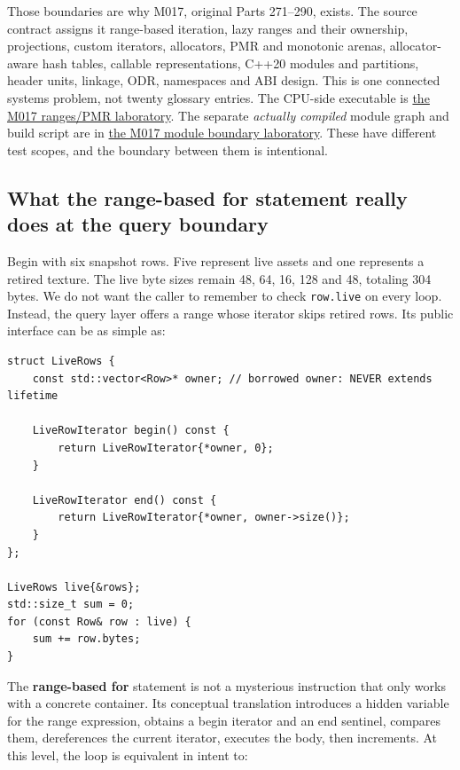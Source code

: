 Those boundaries are why M017, original Parts 271--290, exists. The source contract assigns it range-based iteration, lazy ranges and their ownership, projections, custom iterators, allocators, PMR and monotonic arenas, allocator-aware hash tables, callable representations, C++20 modules and partitions, header units, linkage, ODR, namespaces and ABI design. This is one connected systems problem, not twenty glossary entries. The CPU-side executable is \hyperref[source-file-a1c76c44bc377537c732f5c4]{the M017 ranges/PMR laboratory}. The separate \emph{actually compiled} module graph and build script are in \hyperref[source-file-e1b7c3e4f52da0e7c9c36a41]{the M017 module boundary laboratory}. These have different test scopes, and the boundary between them is intentional.

\subsection{What the range-based for statement really does at the query boundary}\label{01-foundations-i-ch006-what-the-range-based-for-statement-really-does-at-the-query-boundary}

Begin with six snapshot rows. Five represent live assets and one represents a retired texture. The live byte sizes remain 48, 64, 16, 128 and 48, totaling 304 bytes. We do not want the caller to remember to check \texttt{row.live} on every loop. Instead, the query layer offers a range whose iterator skips retired rows. Its public interface can be as simple as:

\begin{verbatim}
struct LiveRows {
    const std::vector<Row>* owner; // borrowed owner: NEVER extends lifetime

    LiveRowIterator begin() const {
        return LiveRowIterator{*owner, 0};
    }

    LiveRowIterator end() const {
        return LiveRowIterator{*owner, owner->size()};
    }
};

LiveRows live{&rows};
std::size_t sum = 0;
for (const Row& row : live) {
    sum += row.bytes;
}
\end{verbatim}

The \textbf{range-based for} statement is not a mysterious instruction that only works with a concrete container. Its conceptual translation introduces a hidden variable for the range expression, obtains a begin iterator and an end sentinel, compares them, dereferences the current iterator, executes the body, then increments. At this level, the loop is equivalent in intent to:

